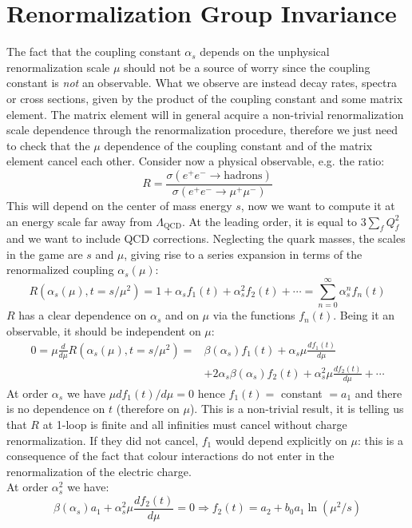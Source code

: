 \documentclass[../main.tex]{subfiles}
\begin{document}
\section{Renormalization Group Invariance}
The fact that the coupling constant $\alpha_s$ depends on the unphysical renormalization scale $\mu$ should not be a source of worry since the coupling constant is \textit{not} an observable. What we observe are instead decay rates, spectra or cross sections, given by the product of the coupling constant and some matrix element. The matrix element will in general acquire a non-trivial renormalization scale dependence through the renormalization procedure, therefore we just need to check that the $\mu$ dependence of the coupling constant and of the matrix element cancel each other.
Consider now a physical observable, e.g. the ratio: 
\[
R=\frac{\sigma(e^+e^-\to\text{hadrons})}{\sigma(e^+e^-\to\mu^+\mu^-)}
\]
This will depend on the center of mass energy $s$, now we want to compute it at an energy scale far away from $\Lambda_{\text{QCD}}$. At the leading order, it is equal to $3\sum_fQ_f^2$ and we want to include QCD corrections. Neglecting the quark masses, the scales in the game are $s$ and $\mu$, giving rise to a series expansion in terms of the renormalized coupling $\alpha_s(\mu)$:
\[
R(\alpha_s(\mu),t=s/\mu^2)=1+\alpha_sf_1(t)+\alpha_s^2f_2(t)+\cdots=\sum_{n=0}^\infty\alpha_s^nf_n(t)
\]
$R$ has a clear dependence on $\alpha_s$ and on $\mu$ via the functions $f_n(t)$. Being it an observable, it should be independent on $\mu$:
\begin{align*}
0=\mu\frac{d}{d\mu}R(\alpha_s(\mu),t=s/\mu^2)=&\beta(\alpha_s)f_1(t)+\alpha_s\mu\frac{df_1(t)}{d\mu}\\
&+2\alpha_s\beta(\alpha_s)f_2(t)+\alpha_s^2\mu\frac{df_2(t)}{d\mu}+\cdots
\end{align*}
At order $\alpha_s$ we have $\mu df_1(t)/d\mu=0$ hence $f_1(t)=$ constant $=a_1$ and there is no dependence on $t$ (therefore on $\mu$). This is a non-trivial result, it is telling us that $R$ at 1-loop is finite and all infinities must cancel without charge renormalization. If they did not cancel, $f_1$ would depend explicitly on $\mu$: this is a consequence of the fact that colour interactions do not enter in the renormalization of the electric charge.\\
At order $\alpha_s^2$ we have:
\[
\beta(\alpha_s)a_1+\alpha_s^2\mu\frac{df_2(t)}{d\mu}=0\Rightarrow f_2(t)=a_2+b_0a_1\ln(\mu^2/s)
\]
\end{document}
